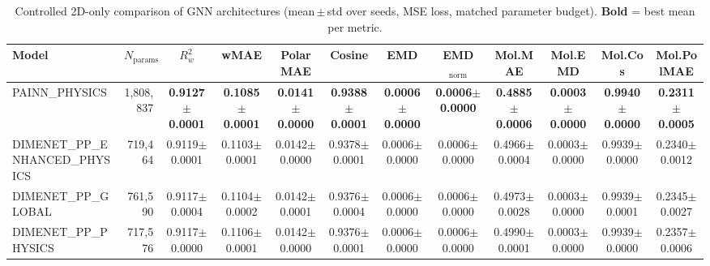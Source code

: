 \begin{table}[ht]
\centering
\caption{Controlled 2D-only comparison of GNN architectures (mean\,$\pm$\,std over seeds, MSE loss, matched parameter budget). \textbf{Bold} = best mean per metric.}
\label{tab:benchmark_2d_physics}
\small
\begin{tabular}{l r c c c c c c c c c c }
\toprule
Model & $N_{\text{params}}$ & $R^2_w$ & wMAE & PolarMAE & Cosine & EMD & EMD$_\mathrm{norm}$ & Mol.MAE & Mol.EMD & Mol.Cos & Mol.PolMAE \\
\midrule
PAINN_PHYSICS & 1,808,837 & \textbf{0.9127$\pm$0.0001} & \textbf{0.1085$\pm$0.0001} & \textbf{0.0141$\pm$0.0000} & \textbf{0.9388$\pm$0.0001} & \textbf{0.0006$\pm$0.0000} & \textbf{0.0006$\pm$0.0000} & \textbf{0.4885$\pm$0.0006} & \textbf{0.0003$\pm$0.0000} & \textbf{0.9940$\pm$0.0000} & \textbf{0.2311$\pm$0.0005} \\
DIMENET_PP_ENHANCED_PHYSICS & 719,464 & 0.9119$\pm$0.0001 & 0.1103$\pm$0.0001 & 0.0142$\pm$0.0000 & 0.9378$\pm$0.0001 & 0.0006$\pm$0.0000 & 0.0006$\pm$0.0000 & 0.4966$\pm$0.0004 & 0.0003$\pm$0.0000 & 0.9939$\pm$0.0000 & 0.2340$\pm$0.0012 \\
DIMENET_PP_GLOBAL & 761,590 & 0.9117$\pm$0.0004 & 0.1104$\pm$0.0002 & 0.0142$\pm$0.0001 & 0.9376$\pm$0.0004 & 0.0006$\pm$0.0000 & 0.0006$\pm$0.0000 & 0.4973$\pm$0.0028 & 0.0003$\pm$0.0000 & 0.9939$\pm$0.0001 & 0.2345$\pm$0.0027 \\
DIMENET_PP_PHYSICS & 717,576 & 0.9117$\pm$0.0000 & 0.1106$\pm$0.0001 & 0.0142$\pm$0.0000 & 0.9376$\pm$0.0001 & 0.0006$\pm$0.0000 & 0.0006$\pm$0.0000 & 0.4990$\pm$0.0001 & 0.0003$\pm$0.0000 & 0.9939$\pm$0.0000 & 0.2357$\pm$0.0006 \\
\bottomrule
\end{tabular}
\end{table}
